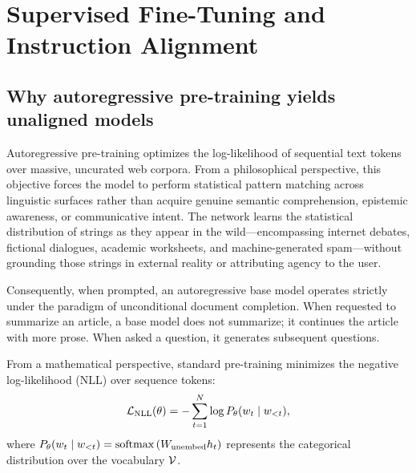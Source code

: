 \documentclass[../../../main.tex]{subfiles}
\begin{document}
\section{Supervised Fine-Tuning and Instruction Alignment}
\label{sec:instruction_tuning_t0_flan}

\subsection{Why autoregressive pre-training yields unaligned models}
\label{subsec:why_autoregressive_yields_unaligned}

Autoregressive pre-training optimizes the log-likelihood of sequential text tokens over massive, uncurated web corpora. From a philosophical perspective, this objective forces the model to perform statistical pattern matching across linguistic surfaces rather than acquire genuine semantic comprehension, epistemic awareness, or communicative intent. The network learns the statistical distribution of strings as they appear in the wild---encompassing internet debates, fictional dialogues, academic worksheets, and machine-generated spam---without grounding those strings in external reality or attributing agency to the user. 

Consequently, when prompted, an autoregressive base model operates strictly under the paradigm of unconditional document completion. When requested to summarize an article, a base model does not summarize; it continues the article with more prose. When asked a question, it generates subsequent questions.

From a mathematical perspective, standard pre-training minimizes the negative log-likelihood (NLL) over sequence tokens:
\begin{equation}
\label{eq:nll_loss_critique}
\mathcal{L}_{\text{NLL}}(\theta) = -\sum_{t=1}^N \log P_\theta(w_t \mid w_{<t}),
\end{equation}
where $P_\theta(w_t \mid w_{<t}) = \operatorname{\mathrm{softmax}}\left(W_{\text{unembed}} h_t\right)$ represents the categorical distribution over the vocabulary $\mathcal{V}$. 
\end{document}
